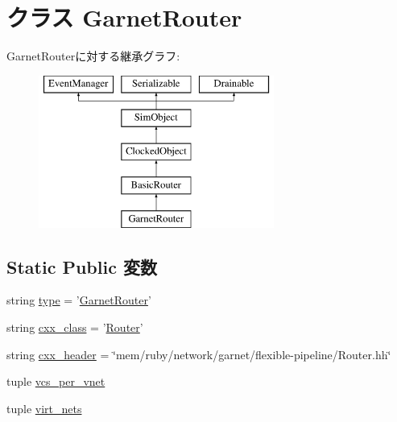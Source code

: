 \hypertarget{classGarnetNetwork_1_1GarnetRouter}{
\section{クラス GarnetRouter}
\label{classGarnetNetwork_1_1GarnetRouter}
}
GarnetRouterに対する継承グラフ:\begin{figure}[H]
\begin{center}
\leavevmode
\includegraphics[height=5cm]{classGarnetNetwork_1_1GarnetRouter}
\end{center}
\end{figure}
\subsection*{Static Public 変数}
\begin{DoxyCompactItemize}
\item 
string \hyperlink{classGarnetNetwork_1_1GarnetRouter_acce15679d830831b0bbe8ebc2a60b2ca}{type} = '\hyperlink{classGarnetNetwork_1_1GarnetRouter}{GarnetRouter}'
\item 
string \hyperlink{classGarnetNetwork_1_1GarnetRouter_a58cd55cd4023648e138237cfc0822ae3}{cxx\_\-class} = '\hyperlink{classRouter}{Router}'
\item 
string \hyperlink{classGarnetNetwork_1_1GarnetRouter_a17da7064bc5c518791f0c891eff05fda}{cxx\_\-header} = \char`\"{}mem/ruby/network/garnet/flexible-\/pipeline/Router.hh\char`\"{}
\item 
tuple \hyperlink{classGarnetNetwork_1_1GarnetRouter_a2bb2221cda9b94b6a0c2944d8a12f31e}{vcs\_\-per\_\-vnet}
\item 
tuple \hyperlink{classGarnetNetwork_1_1GarnetRouter_a84c7a415611bc1b55aa5e7fd9e9601e8}{virt\_\-nets}
\end{DoxyCompactItemize}


